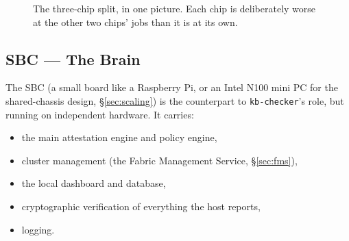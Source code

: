 \documentclass[11pt,a4paper]{article}
\newcommand{\figcap}[1]{\caption{#1}}
\begin{document}
\begin{figure}[h!]
\centering
{}
\figcap{The three-chip split, in one picture. Each chip is deliberately worse at the other two chips' jobs than it is at its own.}
\label{fig:threechips}
\end{figure}

\subsection{SBC --- The Brain}
\label{sec:sbc}

The SBC (a small board like a Raspberry Pi, or an Intel N100 mini PC for
the shared-chassis design, \S\ref{sec:scaling}) is the counterpart to
\texttt{kb-checker}'s role, but running on independent hardware. It
carries:

\begin{itemize}
  \item the main attestation engine and policy engine,
  \item cluster management (the Fabric Management Service,
    \S\ref{sec:fms}),
  \item the local dashboard and database,
  \item cryptographic verification of everything the host reports,
  \item logging.
\end{itemize}
\end{document}
